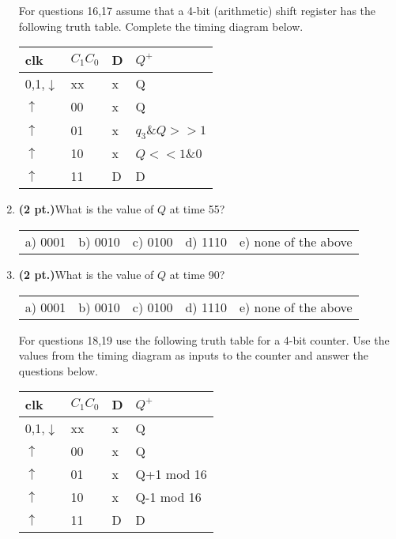 \documentclass{article}
\begin{document}
\begin{enumerate}
\pagebreak
For questions 16,17 assume that a 4-bit (arithmetic) shift register 
has the following truth table.   Complete the timing diagram below.

\begin{tabular}{l|l|l||l}
clk             & $C_1 C_0$     & D & $Q^+$     \\ \hline
0,1,$\downarrow$& xx            & x & Q         \\ \hline
$\uparrow$      & 00            & x & Q         \\  \hline
$\uparrow$      & 01            & x & $q_3$\&$Q>>1$ \\  \hline
$\uparrow$      & 10            & x & $Q<<1$\&0 \\  \hline
$\uparrow$      & 11            & D & D         \\
\end{tabular}


\item {\bf (2 pt.)}What is the value of $Q$ at time 55?

\begin{tabular}{p{0.6in} p{0.6in} p{0.6in} p{0.6in} l}
a) 0001 & b) 0010 & c) 0100 & d) 1110 & e) none of the above
\end{tabular}

\item {\bf (2 pt.)}What is the value of $Q$ at time 90?

\begin{tabular}{p{0.6in} p{0.6in} p{0.6in} p{0.6in} l}
a) 0001 & b) 0010 & c) 0100 & d) 1110 & e) none of the above
\end{tabular}

For questions 18,19 use the following truth table for a 4-bit
counter. Use the values from the timing diagram as inputs
to the counter and answer the questions below.

\begin{tabular}{l|l|l||l}
clk             & $C_1 C_0$     & D & $Q^+$     \\ \hline
0,1,$\downarrow$& xx            & x & Q         \\ \hline
$\uparrow$      & 00            & x & Q         \\  \hline
$\uparrow$      & 01            & x & Q+1 mod 16\\  \hline
$\uparrow$      & 10            & x & Q-1 mod 16\\  \hline
$\uparrow$      & 11            & D & D         \\
\end{tabular}


\end{enumerate}
\end{document}
